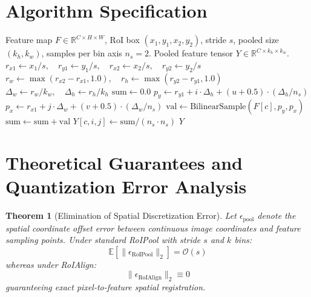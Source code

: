 \documentclass[11pt,a4paper]{article}
\newtheorem{theorem}{Theorem}
\theoremstyle{definition}
\begin{document}
\section{Algorithm Specification}

\begin{algorithm}[H]
\caption{RoIAlign Feature Pooling}
\label{alg:roialign}
\begin{algorithmic}[1]
\Require Feature map $F \in \mathbb{R}^{C \times H \times W}$, RoI box $(x_1, y_1, x_2, y_2)$, stride $s$, pooled size $(k_h, k_w)$, samples per bin axis $n_s = 2$.
\Ensure Pooled feature tensor $Y \in \mathbb{R}^{C \times k_h \times k_w}$.
\State $r_{x1} \gets x_1 / s, \quad r_{y1} \gets y_1 / s, \quad r_{x2} \gets x_2 / s, \quad r_{y2} \gets y_2 / s$
\State $r_w \gets \max(r_{x2} - r_{x1}, 1.0), \quad r_h \gets \max(r_{y2} - r_{y1}, 1.0)$
\State $\Delta_w \gets r_w / k_w, \quad \Delta_h \gets r_h / k_h$
            \State $\text{sum} \gets 0.0$
                \State $p_y \gets r_{y1} + i \cdot \Delta_h + (u + 0.5) \cdot (\Delta_h / n_s)$
                    \State $p_x \gets r_{x1} + j \cdot \Delta_w + (v + 0.5) \cdot (\Delta_w / n_s)$
                    \State $\text{val} \gets \text{BilinearSample}(F[c], p_y, p_x)$
                    \State $\text{sum} \gets \text{sum} + \text{val}$
                \EndFor
            \EndFor
            \State $Y[c, i, j] \gets \text{sum} / (n_s \cdot n_s)$
        \EndFor
    \EndFor
\EndFor
\State \Return $Y$
\end{algorithmic}
\end{algorithm}

\section{Theoretical Guarantees and Quantization Error Analysis}

\begin{theorem}[Elimination of Spatial Discretization Error]
\label{thm:roialign_error}
Let $\epsilon_{\text{pool}}$ denote the spatial coordinate offset error between continuous image coordinates and feature sampling points. Under standard RoIPool with stride $s$ and $k$ bins:
\begin{equation}
\mathbb{E}[\|\epsilon_{\text{RoIPool}}\|_2] = \mathcal{O}(s)
\end{equation}
whereas under RoIAlign:
\begin{equation}
\|\epsilon_{\text{RoIAlign}}\|_2 \equiv 0
\end{equation}
guaranteeing exact pixel-to-feature spatial registration.
\end{theorem}
\end{document}
